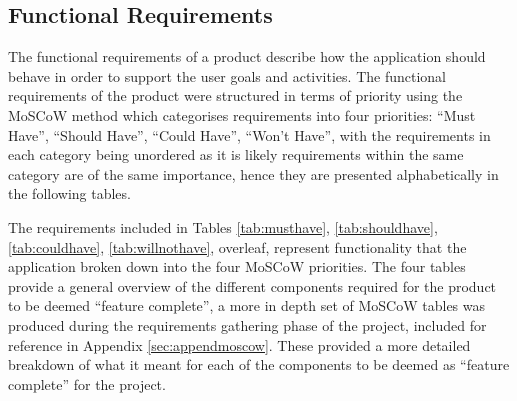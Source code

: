 \documentclass{l4proj}
\begin{document}
\subsection{Functional Requirements}
\label{sec:requirementsfunctional}
The functional requirements of a product describe how the application should behave in order to support the user goals and activities. The functional requirements of the product were structured in terms of priority using the MoSCoW method \cite{moscow} which categorises requirements into four priorities: ``Must Have'', ``Should Have'', ``Could Have'', ``Won’t Have'', with the requirements in each category being unordered as it is likely requirements within the same category are of the same importance, hence they are presented alphabetically in the following tables. 

The requirements included in Tables \ref{tab:musthave}, \ref{tab:shouldhave}, \ref{tab:couldhave}, \ref{tab:willnothave}, overleaf, represent functionality that the application broken down into the four MoSCoW priorities. The four tables provide a general overview of the different components required for the product to be deemed ``feature complete'', a more in depth set of MoSCoW tables was produced during the requirements gathering phase of the project, included for reference in Appendix \ref{sec:appendmoscow}. These provided a more detailed breakdown of what it meant for each of the components to be deemed as ``feature complete'' for the project.
\end{document}
